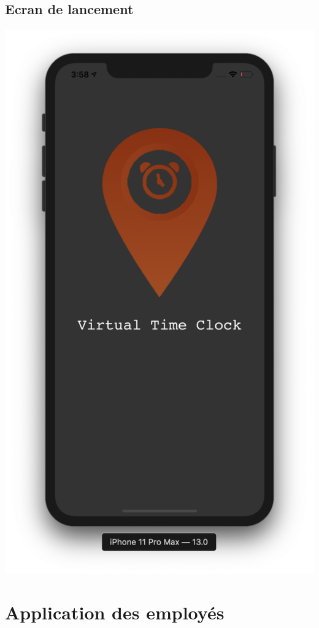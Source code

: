 \documentclass{article}
\begin{document}
\subsection{Ecran de lancement}
\begin{center}
  \includegraphics[scale=0.2]{splashScreenIOS.png}
\end{center}

\newpage

\section{Application des employés}
\end{document}
